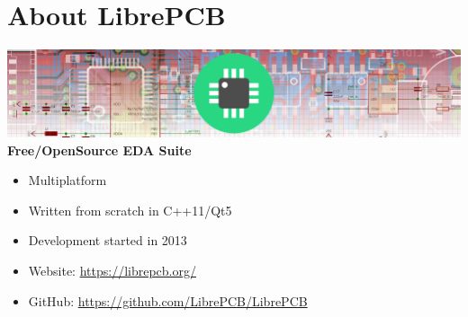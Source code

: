\section{About LibrePCB}

\begin{frame}{\secname}
  \includegraphics[width=\linewidth]{images/about_header.png} \linebreak\linebreak
  \textbf{Free/OpenSource EDA Suite}
  \begin{itemize}
    \item Multiplatform \faLinux\ \faWindows\ \faApple\
    \item Written from scratch in C++11/Qt5
    \item Development started in 2013
    \item Website: \url{https://librepcb.org/}
    \item GitHub: \url{https://github.com/LibrePCB/LibrePCB}
  \end{itemize}
\end{frame}
